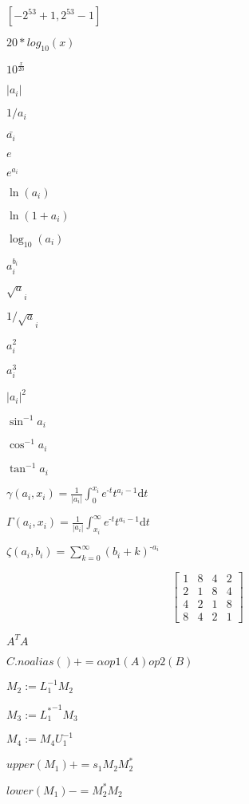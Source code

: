\documentclass{article}
\begin{document}
$[-2^{53}+1, 2^{53}-1]$
\pagebreak

$ 20*log_{10}(x) $
\pagebreak

$ 10^{\frac{x}{20}} $
\pagebreak

$ |a_i| $
\pagebreak

$ 1/a_i $
\pagebreak

$ \bar{a_i} $
\pagebreak

$ e $
\pagebreak

$ e^{a_i} $
\pagebreak

$ \ln({a_i}) $
\pagebreak

$ \ln({1+a_i}) $
\pagebreak

$ \log_{10}({a_i}) $
\pagebreak

$ a_i ^ {b_i} $
\pagebreak

$ \sqrt a_i $
\pagebreak

$ 1/{\sqrt a_i} $
\pagebreak

$ a_i^2 $
\pagebreak

$ a_i^3 $
\pagebreak

$ |a_i|^2 $
\pagebreak

$ \sin^{-1} a_i $
\pagebreak

$ \cos^{-1} a_i $
\pagebreak

$ \tan^{-1} a_i $
\pagebreak

$ \gamma(a_i,x_i)= \frac{1}{|a_i|} \int_{0}^{x_i}e^{\text{-}t} t^{a_i-1} \mathrm{d} t $
\pagebreak

$ \Gamma(a_i,x_i) = \frac{1}{|a_i|} \int_{x_i}^{\infty}e^{\text{-}t} t^{a_i-1} \mathrm{d} t $
\pagebreak

$ \zeta(a_i,b_i)=\sum_{k=0}^{\infty}(b_i+k)^{\text{-}a_i} $
\pagebreak

\[ \begin{bmatrix} 1 & 8 & 4 & 2 \\ 2 & 1 & 8 & 4 \\ 4 & 2 & 1 & 8 \\ 8 & 4 & 2 & 1 \end{bmatrix} \]
\pagebreak

$ A^T A $
\pagebreak

$ C.noalias() += \alpha op1(A) op2(B) $
\pagebreak

$ M_2 := L_1^{-1} M_2 $
\pagebreak

$ M_3 := {L_1^*}^{-1} M_3 $
\pagebreak

$ M_4 := M_4 U_1^{-1} $
\pagebreak

$ upper(M_1) \mathrel{{+}{=}} s_1 M_2 M_2^* $
\pagebreak

$ lower(M_1) \mathbin{{-}{=}} M_2^* M_2 $
\pagebreak
\end{document}

